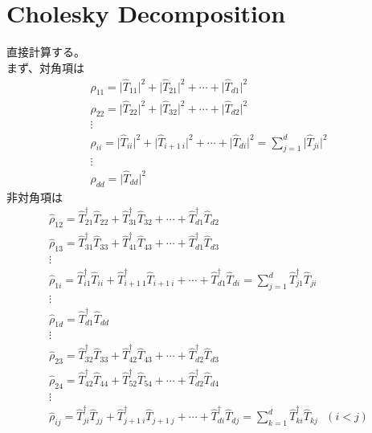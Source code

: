 \documentclass[11pt,a4j,notitlepage]{jreport}
\begin{document}
	\appendix

	\chapter{Cholesky Decomposition}

	直接計算する。\\

	まず、対角項は
	\begin{equation*}
		\begin{gathered}
			\hat{\rho}_{11} = \big| \hat{T}_{11} \big|^2 + \big| \hat{T}_{21} \big|^2 + \cdots + \big| \hat{T}_{d1} \big|^2 \\
			\hat{\rho}_{22} = \big| \hat{T}_{22} \big|^2 + \big| \hat{T}_{32} \big|^2 + \cdots + \big| \hat{T}_{d2} \big|^2 \\
			\vdots \\
			\hat{\rho}_{ii} = \big| \hat{T}_{ii} \big|^2 + \big| \hat{T}_{i+1\ i} \big|^2 + \cdots + \big| \hat{T}_{di} \big|^2 = \sum_{j=1}^d \big| \hat{T}_{ji} \big|^2 \\
			\vdots \\
			\hat{\rho}_{dd} = \big| \hat{T}_{dd} \big|^2
		\end{gathered}
	\end{equation*}
	非対角項は
	\begin{equation*}
		\begin{gathered}
			\hat{\rho}_{12} = \hat{T}_{21}^\dagger \hat{T}_{22} + \hat{T}_{31}^\dagger \hat{T}_{32} + \cdots + \hat{T}_{d1}^\dagger \hat{T}_{d2} \\
			\hat{\rho}_{13} = \hat{T}_{31}^\dagger \hat{T}_{33} + \hat{T}_{41}^\dagger \hat{T}_{43} + \cdots + \hat{T}_{d1}^\dagger \hat{T}_{d3} \\
			\vdots \\
			\hat{\rho}_{1i} = \hat{T}_{i1}^\dagger \hat{T}_{ii} + \hat{T}_{i+1\ 1}^\dagger \hat{T}_{i+1\ i} + \cdots + \hat{T}_{d1}^\dagger \hat{T}_{di} = \sum_{j=1}^d \hat{T}_{j1}^\dagger \hat{T}_{ji}\\
			\vdots \\
			\hat{\rho}_{1d} = \hat{T}_{d1}^\dagger \hat{T}_{dd} \\
			\vdots \\
			\hat{\rho}_{23} = \hat{T}_{32}^\dagger \hat{T}_{33} + \hat{T}_{42}^\dagger \hat{T}_{43} + \cdots + \hat{T}_{d2}^\dagger \hat{T}_{d3} \\
			\hat{\rho}_{24} = \hat{T}_{42}^\dagger \hat{T}_{44} + \hat{T}_{52}^\dagger \hat{T}_{54} + \cdots + \hat{T}_{d2}^\dagger \hat{T}_{d4} \\
			\vdots \\
			\hat{\rho}_{ij} = \hat{T}_{ji}^\dagger \hat{T}_{jj} + \hat{T}_{j+1\ i}^\dagger \hat{T}_{j+1\ j} + \cdots + \hat{T}_{di}^\dagger \hat{T}_{dj} = \sum_{k=1}^d \hat{T}_{ki}^\dagger \hat{T}_{kj}\ \ \ (i<j)
		\end{gathered}
	\end{equation*}
\end{document}
